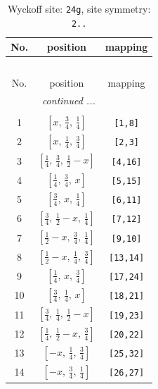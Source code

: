 \documentclass[fleqn,8pt]{jsarticle}
\begin{document}
\renewcommand{\arraystretch}{1.2}
\begin{longtable}{ccc}
\caption{Wyckoff site: {\tt 24g}, site symmetry: {\tt 2..}}
 \\
 \hline \hline
No. & position & mapping \\ \hline \endfirsthead

\multicolumn{2}{l}{\tablename\ \thetable{}} \\
 \hline \hline
No. & position & mapping \\ \hline \endhead

 \hline \hline
\multicolumn{2}{r}{\footnotesize\it continued ...} \\ \endfoot

 \hline \hline
\multicolumn{2}{r}{} \\ \endlastfoot

1 & $\left[ x,\, \frac{3}{4},\, \frac{1}{4} \right]$ & {\tt [1,8]} \\ \hline
2 & $\left[ x,\, \frac{1}{4},\, \frac{3}{4} \right]$ & {\tt [2,3]} \\ \hline
3 & $\left[ \frac{1}{4},\, \frac{3}{4},\, \frac{1}{2} - x \right]$ & {\tt [4,16]} \\ \hline
4 & $\left[ \frac{1}{4},\, \frac{3}{4},\, x \right]$ & {\tt [5,15]} \\ \hline
5 & $\left[ \frac{3}{4},\, x,\, \frac{1}{4} \right]$ & {\tt [6,11]} \\ \hline
6 & $\left[ \frac{3}{4},\, \frac{1}{2} - x,\, \frac{1}{4} \right]$ & {\tt [7,12]} \\ \hline
7 & $\left[ \frac{1}{2} - x,\, \frac{3}{4},\, \frac{1}{4} \right]$ & {\tt [9,10]} \\ \hline
8 & $\left[ \frac{1}{2} - x,\, \frac{1}{4},\, \frac{3}{4} \right]$ & {\tt [13,14]} \\ \hline
9 & $\left[ \frac{1}{4},\, x,\, \frac{3}{4} \right]$ & {\tt [17,24]} \\ \hline
10 & $\left[ \frac{3}{4},\, \frac{1}{4},\, x \right]$ & {\tt [18,21]} \\ \hline
11 & $\left[ \frac{3}{4},\, \frac{1}{4},\, \frac{1}{2} - x \right]$ & {\tt [19,23]} \\ \hline
12 & $\left[ \frac{1}{4},\, \frac{1}{2} - x,\, \frac{3}{4} \right]$ & {\tt [20,22]} \\ \hline
13 & $\left[ - x,\, \frac{1}{4},\, \frac{3}{4} \right]$ & {\tt [25,32]} \\ \hline
14 & $\left[ - x,\, \frac{3}{4},\, \frac{1}{4} \right]$ & {\tt [26,27]} \\ \hline

\end{longtable}
\end{document}
